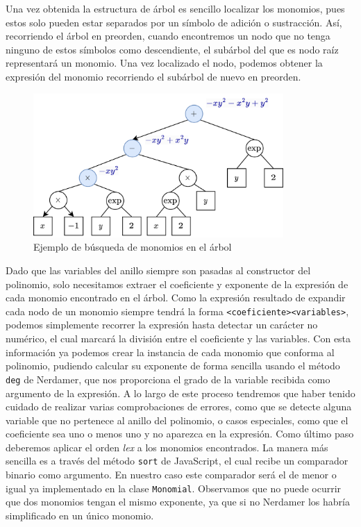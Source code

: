 Una vez obtenida la estructura de árbol es sencillo localizar los monomios, pues estos solo pueden estar separados por un símbolo de adición o sustracción. Así, recorriendo el árbol en preorden, cuando encontremos un nodo que no tenga ninguno de estos símbolos como descendiente, el subárbol del que es nodo raíz representará un monomio. Una vez localizado el nodo, podemos obtener la expresión del monomio recorriendo el subárbol de nuevo en preorden.\newline
\begin{figure}[ht!]
    \centering
    \includegraphics[width=0.85\textwidth]{Plantilla-TFG-master/img/busquedaMon.png}
    \caption{Ejemplo de búsqueda de monomios en el árbol}
    \label{fig:busquedaMonom}
\end{figure}

Dado que las variables del anillo siempre son pasadas al constructor del polinomio, solo necesitamos extraer el coeficiente y exponente de la expresión de cada monomio encontrado en el árbol. Como la expresión resultado de expandir cada nodo de un monomio siempre tendrá la forma \texttt{<coeficiente><variables>}, podemos simplemente recorrer la expresión hasta detectar un carácter no numérico, el cual marcará la división entre el coeficiente y las variables. Con esta información ya podemos crear la instancia de cada monomio que conforma al polinomio, pudiendo calcular su exponente de forma sencilla usando el método \texttt{deg} de Nerdamer, que nos proporciona el grado de la variable recibida como argumento de la expresión. A lo largo de este proceso tendremos que haber tenido cuidado de realizar varias comprobaciones de errores, como que se detecte alguna variable que no pertenece al anillo del polinomio, o casos especiales, como que el coeficiente sea uno o menos uno y no aparezca en la expresión. Como último paso deberemos aplicar el orden \textit{lex} a los monomios encontrados. La manera más sencilla es a través del método \texttt{sort} de JavaScript, el cual recibe un comparador binario como argumento. En nuestro caso este comparador será el de menor o igual ya implementado en la clase \texttt{Monomial}. Observamos que no puede ocurrir que dos monomios tengan el mismo exponente, ya que si no Nerdamer los habría simplificado en un único monomio.\newline

